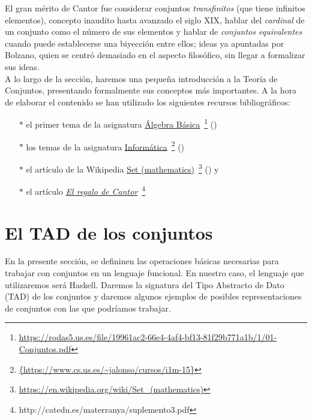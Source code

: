 El gran mérito de Cantor fue considerar conjuntos \textit{transfinitos} (que
tiene infinitos elementos), concepto inaudito hasta avanzado el siglo XIX,
hablar del \textit{cardinal} de un conjunto como el número de sus elementos y
hablar de \textit{conjuntos equivalentes} cuando puede establecerse una
biyección entre ellos; ideas ya apuntadas por Bolzano, quien se centró
demasiado en el aspecto filosófico, sin llegar a formalizar sus ideas.\\


A lo largo de la sección, haremos una pequeña introducción a la Teoría de
Conjuntos, presentando formalmente sus conceptos más importantes. A la hora de 
elaborar el contenido se han utilizado los siguientes recursos bibliográficos:

\begin{itemize}
\item[$*$] el primer tema de la asignatura
\href{https://rodas5.us.es/file/19961ac2-66e4-4af4-bf13-81f29b771a1b/1/01-Conjuntos.pdf}
     {Álgebra Básica}\
\footnote{\url{https://rodas5.us.es/file/19961ac2-66e4-4af4-bf13-81f29b771a1b/1/01-Conjuntos.pdf}}
(\cite{Algebra-15a})

\item[$*$] los temas de la asignatura 
\href{https://www.cs.us.es/~jalonso/cursos/i1m-15}
     {Informática}\
\footnote{\url{{https://www.cs.us.es/~jalonso/cursos/i1m-15}}}
(\cite{Alonso-15a}) 
 
\item[$*$] el artículo de la Wikipedia
\href{https://en.wikipedia.org/wiki/Set_(mathematics)}
     {Set (mathematics)}\
\footnote{\url{https://en.wikipedia.org/wiki/Set_(mathematics)}}
(\cite{Wikipedia-grafos}) y

\item[$*$] el artículo
\href{http://catedu.es/materranya/suplemento3.pdf}
     {\textit{El regalo de Cantor}}\
\footnote{http://catedu.es/materranya/suplemento3.pdf}
\end{itemize}

\section{El TAD de los conjuntos}

\label{sec:TAD_conjuntos}

En la presente sección, se defininen las operaciones básicas necesarias
para trabajar con conjuntos en un lenguaje funcional. En nuestro caso, 
el lenguaje que utilizaremos será Haskell. Daremos la signatura del Tipo
Abstracto de Dato (TAD) de los conjuntos y daremos algunos ejemplos de 
posibles representaciones de conjuntos con las que podríamos trabajar.

